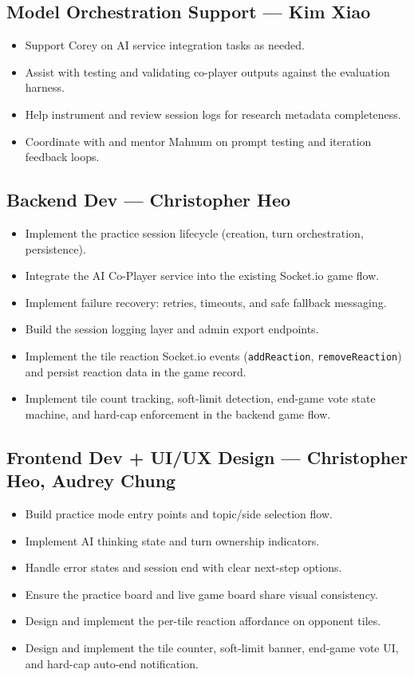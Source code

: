 \documentclass[11pt]{article}
\begin{document}
\subsection{Model Orchestration Support --- Kim Xiao}

\begin{itemize}
  \item Support Corey on AI service integration tasks as needed.
  \item Assist with testing and validating co-player outputs against the evaluation harness.
  \item Help instrument and review session logs for research metadata completeness.
  \item Coordinate with and mentor Mahnum on prompt testing and iteration feedback loops.
\end{itemize}

\subsection{Backend Dev --- Christopher Heo}

\begin{itemize}
  \item Implement the practice session lifecycle (creation, turn orchestration, persistence).
  \item Integrate the AI Co-Player service into the existing Socket.io game flow.
  \item Implement failure recovery: retries, timeouts, and safe fallback messaging.
  \item Build the session logging layer and admin export endpoints.
  \item Implement the tile reaction Socket.io events (\texttt{addReaction},
        \texttt{removeReaction}) and persist reaction data in the game record.
  \item Implement tile count tracking, soft-limit detection, end-game vote state machine,
        and hard-cap enforcement in the backend game flow.
\end{itemize}

\subsection{Frontend Dev + UI/UX Design --- Christopher Heo, Audrey Chung}

\begin{itemize}
  \item Build practice mode entry points and topic/side selection flow.
  \item Implement AI thinking state and turn ownership indicators.
  \item Handle error states and session end with clear next-step options.
  \item Ensure the practice board and live game board share visual consistency.
  \item Design and implement the per-tile reaction affordance on opponent tiles.
  \item Design and implement the tile counter, soft-limit banner, end-game vote UI,
        and hard-cap auto-end notification.
\end{itemize}
\end{document}
